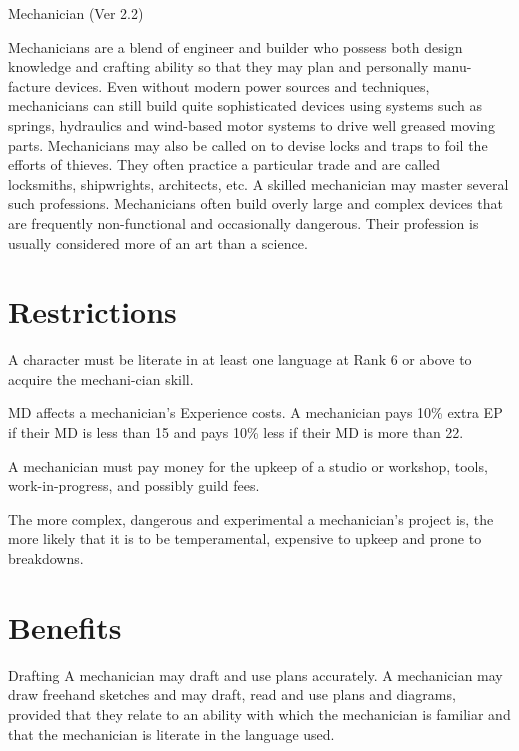 \begin{Chapter}{Mechanician (Ver 2.2)}

Mechanicians are a blend of engineer and builder who possess both
design knowledge and crafting ability so that they may plan and
personally manu- facture devices.  Even without modern power sources
and techniques, mechanicians can still build quite sophisticated
devices using systems such as springs, hydraulics and wind-based motor
systems to drive well greased moving parts.  Mechanicians may also be
called on to devise locks and traps to foil the efforts of thieves.
They often practice a particular trade and are called locksmiths,
shipwrights, architects, etc.  A skilled mechanician may master
several such professions.  Mechanicians often build overly large and
complex devices that are frequently non-functional and occasionally
dangerous. Their profession is usually considered more of an art than
a science.

\section{Restrictions}

A character must be literate in at least one language at Rank 6 or
above to acquire the mechani-cian skill.

MD affects a mechanician’s Experience costs.  A mechanician pays 10\%
extra EP if their MD is less than 15 and pays 10\% less if their MD is
more than 22.

A mechanician must pay money for the upkeep of a studio or workshop,
tools, work-in-progress, and possibly guild fees.

The more complex, dangerous and experimental a mechanician’s project
is, the more likely that it is to be temperamental, expensive to
upkeep and prone to breakdowns.

\section{Benefits}

\begin{Description}
  
\item[Drafting] A mechanician may draft and use plans accurately.  A
  mechanician may draw freehand sketches and may draft, read and use
  plans and diagrams, provided that they relate to an ability with
  which the mechanician is familiar and that the mechanician is
  literate in the language used.


\end{Description}
\end{Chapter}
